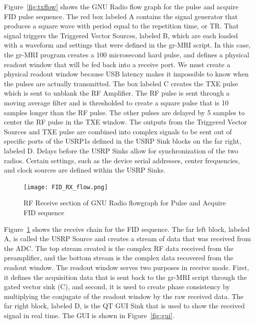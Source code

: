 \documentclass[review]{elsarticle}
\renewcommand{\textcolor}[1]{}
\begin{document}
Figure~\ref{fig:txflow}  shows the GNU Radio flow graph for the pulse and acquire FID pulse sequence.  The red box labeled A contains the signal generator that produces a square wave with period equal to the repetition time, or TR.  That signal triggers the Triggered Vector Sources, labeled B, which are each loaded with a waveform and settings that were defined in the gr-MRI script. In this case, the gr-MRI program creates a 100 microsecond hard pulse, and defines a physical readout window that will be fed back into a receive port.  We must create a physical readout window because USB latency makes it impossible to know when the pulses are actually transmitted.  The box labeled C creates the TXE pulse which is sent to unblank the RF Amplifier.  The RF pulse is sent through a moving average filter and is thresholded to create a square pulse that is 10 samples longer than the RF pulse.  The other pulses are delayed by 5 samples to center the RF pulse in the TXE window.  The outputs from the Triggered Vector Sources and TXE pulse are combined into complex signals to be sent out of specific ports of the USRP1s defined in the USRP Sink blocks on the far right, labeled D.  Delays before the USRP Sinks allow for synchronization of the two radios.  Certain settings, such as the device serial addresses, center frequencies, and clock sources are defined within the USRP Sinks.

\begin{figure}[ht]
\begin{center}
\texttt{[image: FID\_RX\_flow.png]}
\caption{\textcolor{black}{RF Receive section of GNU Radio flowgraph for Pulse and Acquire FID sequence}}
\label{fig:rxflow}
\end{center}
\end{figure}

Figure~\ref{fig:rxflow} shows the receive chain for the FID sequence.  The far left block, labeled A, is called the USRP Source and creates a stream of data that was received from the ADC.  The top stream created is the complex RF data received from the preamplifier, and the bottom stream is the complex data recovered from the readout window.  The readout window serves two purposes in receive mode.  First, it defines the acquisition data that is sent back to the gr-MRI script through the gated vector sink (C), and second, it is used to create phase consistency by multiplying the conjugate of the readout window by the raw received data.  The far right block, labeled D, is the QT GUI Sink that is used to show the received signal in real time.  The GUI is shown in Figure~\ref{fig:gui}.
\end{document}
